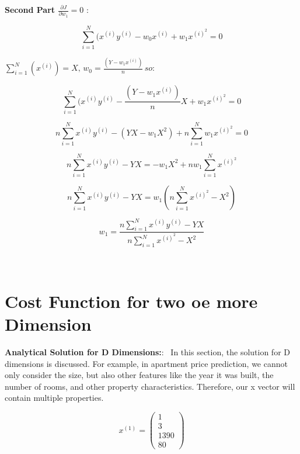 \documentclass{article}
\newenvironment{cheatformula}[1][כותרת]{
    \begin{minipage}{\linewidth}
    \textbf{#1}:
}{
    \end{minipage}\\[0ex]
}
\begin{document}
\begin{multicols*}{2}
\begin{cheatformula}[Second Part $\frac{\partial J}{\partial w_{1}} = 0$ ]
\begin{equation}
\sum_{i=1}^{N} (x^{(i)}y^{(i)} - w_{0}x^{(i)} + w_{1}x^{(i)^{2}} = 0
\end{equation}

$ \sum_{i=1}^{N} (x^{(i)})=X   ,\,  w_{0} = \frac{(Y -w_{1}x^{(i)})}{n} \, so: $

\begin{equation}
\sum_{i=1}^{N} (x^{(i)}y^{(i)} - \frac{(Y -w_{1}x^{(i)})}{n} X  + w_{1}x^{(i)^{2}} = 0
\end{equation}

\begin{equation}
n \sum_{i=1}^{N} x^{(i)}y^{(i)} - {(YX -w_{1}X^{2})}   + n\sum_{i=1}^{N}w_{1}x^{(i)^{2}} = 0
\end{equation}

\begin{equation}
n \sum_{i=1}^{N} x^{(i)}y^{(i)} - YX=  - w_{1}X^{2}   + n w_{1}\sum_{i=1}^{N}x^{(i)^{2}}
\end{equation}

\begin{equation}
n \sum_{i=1}^{N} x^{(i)}y^{(i)} - YX = w_{1} (n \sum_{i=1}^{N}x^{(i)^{2}} - X^{2})
\end{equation}

\begin{equation}
w_{1} = \frac{n \sum_{i=1}^{N} x^{(i)}y^{(i)} - YX}{n \sum_{i=1}^{N}x^{(i)^{2}} - X^{2}}
\end{equation}

 
\end{cheatformula}
\pagebreak


\section{Cost Function for two oe more Dimension}

\begin{cheatformula}[Analytical Solution for D Dimensions:]\
In this section, the solution for D dimensions is discussed. For example, in apartment price prediction, we cannot only consider the size, but also other features like the year it was built, the number of rooms, and other property characteristics. Therefore, our x vector will contain multiple properties.

\begin{equation}
x ^{(1)}= \begin{pmatrix}
 1\\ 3 \\1390 \\80
\end{pmatrix}
\end{equation}


\end{cheatformula}
\end{multicols*}
\end{document}
